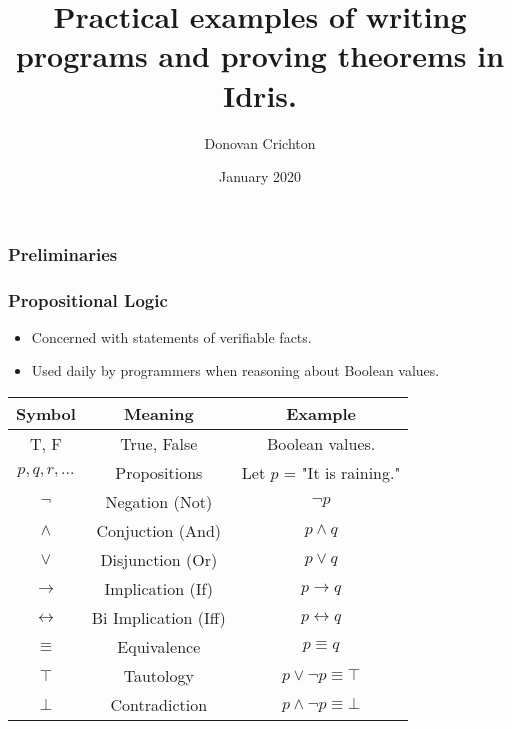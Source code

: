 \documentclass{beamer}
\title{Practical examples of writing programs and proving theorems in Idris.}
\author{Donovan Crichton}
\date{January 2020}
\begin{document}
 
\frame{\titlepage}

\begin{frame}[fragile]
  \frametitle{Preliminaries}

\end{frame}

\begin{frame}[fragile]
  \frametitle{Propositional Logic}
  \begin{itemize}
    \item Concerned with statements of verifiable facts. 
    \item Used daily by programmers when reasoning about Boolean values.
  \end{itemize}
  \begin{tabular}{| c | c | c |}
  \hline
  \textbf{Symbol} & \textbf{Meaning} & \textbf{Example} \\
  \hline
  T, F & True, False & Boolean values. \\
  $p, q, r, ...$  & Propositions & Let $p$ = "It is raining." \\
  $\lnot$ & Negation (Not) & $\lnot p$ \\
  $\land$ & Conjuction (And) & $p \land q$ \\
  $\lor$ & Disjunction (Or) & $p \lor q$ \\
  $\rightarrow$ & Implication (If) & $p \rightarrow q$ \\
  $\leftrightarrow$ & Bi Implication (Iff) & $p \leftrightarrow q$ \\
  $\equiv$ & Equivalence & $p \equiv q$ \\
  $\top$ & Tautology & $p \lor \lnot p \equiv \top$ \\
  $\bot$ & Contradiction & $p \land \lnot p \equiv \bot$ \\
  \hline
  \end{tabular}
\end{frame}
\end{document}
